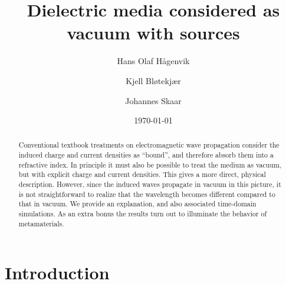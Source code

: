 \documentclass[prb,twocolumn]{revtex4-1}
\begin{document}

\title{Dielectric media considered as vacuum with sources}

\author{Hans Olaf Hågenvik}

\author{Kjell Bløtekjær}

\author{Johannes Skaar}


\date{\today}

\begin{abstract}
Conventional textbook treatments on electromagnetic wave propagation consider the induced charge and current densities as ``bound'', and therefore absorb them into a refractive index. In principle it must also be possible to treat the medium as vacuum, but with explicit charge and current densities. This gives a more direct, physical description. However, since the induced waves propagate in vacuum in this picture, it is not straightforward to realize that the wavelength becomes different compared to that in vacuum. We provide an explanation, and also associated time-domain simulations. As an extra bonus the results turn out to illuminate the behavior of metamaterials.
\end{abstract}

\maketitle %

\section{Introduction}
\end{document}
